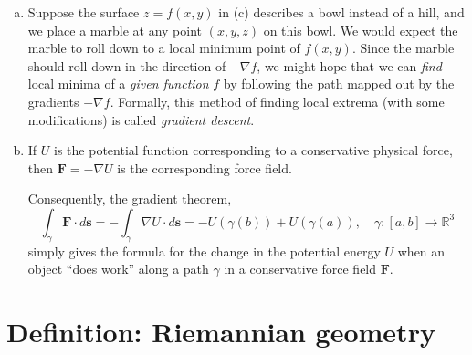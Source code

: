 \documentclass{article}
\newcommand{\real}{\mathbb{R}}
\providecommand{\defnterm}[1]{\emph{#1}}
\newcommand{\vF}{\mathbf{F}}
\newcommand{\vs}{\mathbf{s}}
\begin{document}
\begin{enumerate}[(a)]
\item
Suppose the surface $z = f(x, y)$ in (c) describes a bowl instead of a hill,
and we place a marble at any point $(x, y, z)$ on this bowl.
We would expect the marble to roll down to a local minimum point of $f(x, y)$.
Since the marble should roll down in the direction of $-\nabla f$,
we might hope that we can \emph{find} local minima
of a \emph{given function} $f$ by following the path mapped out
by the gradients $-\nabla f$.  Formally, this method of
finding local extrema (with some modifications) is called \defnterm{gradient descent}.


\item
If $U$ is the potential function corresponding to a
conservative physical force, then $\vF = -\nabla U$
is the corresponding force field.

Consequently, the gradient theorem,
\[
\int_\gamma \vF \cdot d\vs = -\int_\gamma \nabla U \cdot d\vs = -U(\gamma(b)) + U(\gamma(a)), \quad \gamma\colon [a, b] \to \real^3
\]
simply gives the formula for the change in the potential energy $U$
when an object ``does work'' along a path $\gamma$ in a conservative force field $\vF$.

\end{enumerate}





\section{Definition: Riemannian geometry}
\end{document}
